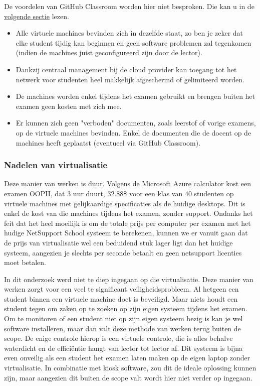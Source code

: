 De voordelen van GitHub Classroom worden hier niet besproken. Die kan u in de \hyperref[sec:GHC]{volgende sectie} lezen.
\begin{itemize}
 \item Alle virtuele machines bevinden zich in dezelfde staat, zo ben je zeker dat elke student tijdig kan beginnen en geen software problemen zal tegenkomen (indien de machines juist geconfigureerd zijn door de lector). 
 \item Dankzij centraal management bij de cloud provider kan toegang tot het netwerk voor studenten heel makkelijk afgeschermd of gelimiteerd worden.
 \item  De machines worden enkel tijdens het examen gebruikt en brengen buiten het examen geen kosten met zich mee. 
 \item Er kunnen zich geen "verboden" documenten, zoals leerstof of vorige examens, op de virtuele machines bevinden. Enkel de documenten die de docent op de machines heeft geplaatst (eventueel via GitHub Classroom).
\end{itemize}

\subsubsection{Nadelen van virtualisatie}



	 Deze manier van werken is duur. Volgens de Microsoft Azure calculator kost een examen OOPII, dat 3 uur duurt, 32.88\$ voor een klas van 40 studenten op virtuele machines met gelijkaardige specificaties als de huidige desktops. Dit is enkel de kost van die machines tijdens het examen, zonder support. Ondanks het feit dat het heel moeilijk is om de totale prijs per computer per examen met het hudige NetSupport School systeem te berekenen, kunnen we er vanuit gaan dat de prijs van virtualisatie wel een beduidend stuk lager ligt dan het huidige systeem, aangezien je slechts per seconde betaalt en geen netsupport licenties moet betalen. 
	
	In dit onderzoek werd niet te diep ingegaan op die virtualisatie. Deze manier van werken zorgt voor een veel te significant veiligheidsprobleem. Al hetgeen een student binnen een virtuele machine doet is beveiligd. Maar niets houdt een student tegen om zaken op te zoeken op zijn eigen systeem tijdens het examen. Om te monitoren of een student niet op zijn eigen systeem bezig is kan je wel software installeren, maar dan valt deze methode van werken terug buiten de scope. De enige controle hierop is een virtuele controle, die is alles behalve waterdicht en de effici\"entie hangt van lector tot lector af. Dit systeem is bijna even onveilig als een student het examen laten maken op de eigen laptop zonder virtualisatie. In combinatie met kiosk software, zou dit de ideale oplossing kunnen zijn, maar aangezien dit buiten de scope valt wordt hier niet verder op ingegaan.
	

